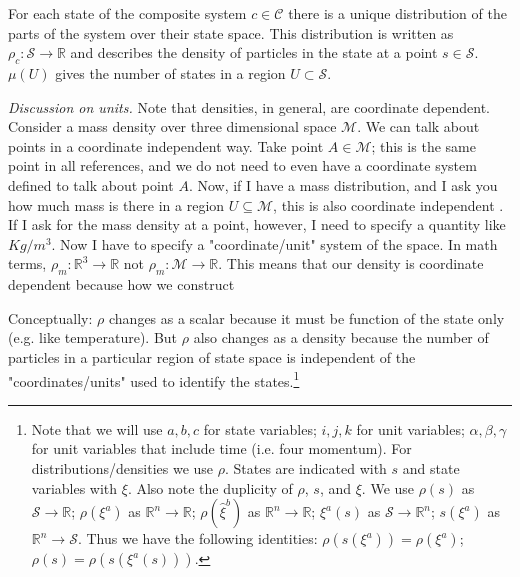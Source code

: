 \documentclass{article}
\begin{document}

\begin{defn}
	For each state of the composite system $c \in \mathcal{C}$ there is a unique distribution of the parts of the system over their state space. This distribution is written as $\rho_c: \mathcal{S} \rightarrow \mathbb{R}$ and describes the density of particles in the state at a point $s \in \mathcal{S}$. $\mu(U)$ gives the number of states in a region $U \subset \mathcal{S}$.
\end{defn}

	\emph{Discussion on units.} Note that densities, in general, are coordinate dependent. Consider a mass density over three dimensional space $\mathcal{M}$. We can talk about points in a coordinate independent way. Take point $A \in \mathcal{M}$; this is the same point in all references, and we do not need to even have a coordinate system defined to talk about point $A$. Now, if I have a mass distribution, and I ask you how much mass is there in a region $U \subseteq \mathcal{M}$, this is also coordinate independent . If I ask for the mass density at a point, however, I need to specify a quantity like $Kg/m^3$. Now I have to specify a "coordinate/unit" system of the space. In math terms, $\rho_m : \mathbb{R}^3 \to \mathbb{R}$ not $\rho_m : \mathcal{M} \to \mathbb{R}$. This means that our density is coordinate dependent because how we construct 

Conceptually: $\rho$ changes as a scalar because it must be function of the state only (e.g. like temperature). But $\rho$ also changes as a density because the number of particles in a particular region of state space is independent of the "coordinates/units" used to identify the states.\footnote{Note that we will use $a, b, c$ for state variables; $i, j, k$ for unit variables; $\alpha, \beta, \gamma$ for unit variables that include time (i.e. four momentum). For distributions/densities we use $\rho$. States are indicated with $s$ and state variables with $\xi$.
Also note the duplicity of $\rho$, $s$, and $\xi$. We use $\rho(s)$ as $\mathcal{S} \to \mathbb{R}$; $\rho(\xi^a)$ as $\mathbb{R}^n \to \mathbb{R}$; $\rho(\hat{\xi}^b)$ as $\mathbb{R}^n \to \mathbb{R}$; $\xi^a(s)$ as $\mathcal{S} \to \mathbb{R}^n$; $s(\xi^a)$ as $\mathbb{R}^n \to \mathcal{S}$.
Thus we have the following identities: $\rho(s(\xi^a)) = \rho(\xi^a)$; $\rho(s) = \rho(s (\xi^a(s)))$.}
\end{document}
